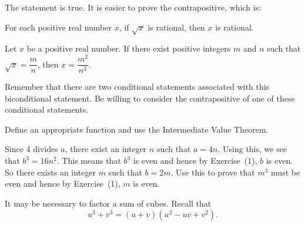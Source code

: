 \begin{list}{\bf{\ref{exer:sec32-rational}.}}
\item The statement is true.  It is easier to prove the contrapositive, which is:
\begin{list}{}
\item For each positive real number $x$, if $\sqrt{x}$ is rational, then $x$ is rational.
\end{list}
Let $x$ be a positive real number.  If there exist positive integers $m$ and $n$ such that $\sqrt{x} = \dfrac{m}{n}$, then 
$x = \dfrac{m^2}{n^2}$.
\end{list}


\begin{list}{\bf{\ref{exer:sec32-8}.}}
\item Remember that there are two conditional statements associated with this biconditional statement.  Be willing to consider the contrapositive of one of these conditional statements.
\end{list}


\begin{list}{\bf{\ref{exer:IVT}.}}
\item Define an appropriate function and use the Intermediate Value Theorem.
\end{list}


\begin{list}{\bf{\ref{exer:sec32-16}.}}
\item \begin{list}{\bf{(b)}}
\item Since 4 divides $a$, there exist an integer $n$ such that $a = 4n$.  Using this, we see that $b^3 = 16n^2$. This means that $b^3$ is even and hence by Exercise~(1), $b$ is even.   So there exists an integer $m$ such that $b = 2m$.  Use this to prove that $m^3$ must be even and hence by Exercise~(1), $m$ is even.
\end{list}
\end{list}

\begin{list}{\bf{\ref{exer:sec32-equation17}.}}
\item It may be necessary to factor a sum  of cubes.  Recall that 
\[
u^3 + v^3 = ( u + v ) ( u^2 - uv + v^2 ).
\]
\end{list}

\hbreak
\renewcommand{\labelenumi}{\textbf{\arabic{enumi}.}}

\endinput
